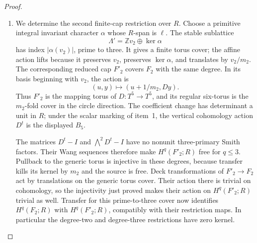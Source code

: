 \documentclass[11pt,a4paper]{article}
\numberwithin{equation}{section}
\theoremstyle{definition}
\begin{document}
\begin{proof}
\begin{enumerate}[label=\arabic*.]
Set $a_i=\ell(v_i)$.  An arbitrary cusp clutch contributes a scalar
$\delta$ to $g_1+g_2=\delta z$.  The remaining relation matrix is
\[
 \begin{pmatrix}m_1&0&-a_1\\0&m_2&-a_2\\1&1&-\delta\end{pmatrix}.
\]
Its determinant is a unit for a simply connected total space.
Since $3\mid m_2$ and $3\nmid m_1$, reduction modulo three makes
$a_2$ a unit in $R$.  This conclusion includes arbitrary clutch
translations and twists.

\item We determine the second finite-cap restriction over $R$.
Choose a primitive integral invariant character $\alpha$ whose
$R$-span is $\ell$.  The stable sublattice
\[
 \Lambda'=\mathbb Z v_2\oplus\ker\alpha
\]
has index $|\alpha(v_2)|$, prime to three.  It gives a finite torus cover; the affine action lifts because it preserves
$v_2$, preserves $\ker\alpha$, and translates by $v_2/m_2$.
The corresponding reduced cap $F'_2$ covers $F_2$ with the same
degree.  In its basis beginning with $v_2$, the action is
\[
 (u,y)\longmapsto(u+1/m_2,Dy).
\]
Thus $F'_2$ is the mapping torus of $D:T^5\to T^5$, and its
regular six-torus is the $m_2$-fold cover in the circle direction.
The coefficient change has determinant a unit in $R$; under the
scalar marking of item~1, the vertical cohomology action $D^t$
is the displayed $B_5$.

The matrices $D^t-I$ and $\bigwedge^2D^t-I$ have no nonunit
three-primary Smith factors.  Their Wang sequences therefore make
$H^q(F'_2;R)$ free for $q\leq3$.  Pullback to the generic torus
is injective in these degrees, because transfer kills its kernel
by $m_2$ and the source is free.  Deck transformations of
$F'_2\to F_2$ act by translations on the generic torus cover.
Their action there is trivial on cohomology, so the injectivity
just proved makes their action on $H^q(F'_2;R)$ trivial as well.
Transfer for this prime-to-three cover now identifies
$H^q(F_2;R)$ with $H^q(F'_2;R)$, compatibly with their restriction maps.  In particular the degree-two and degree-three
restrictions have zero kernel.


\end{enumerate}
\end{proof}
\end{document}
